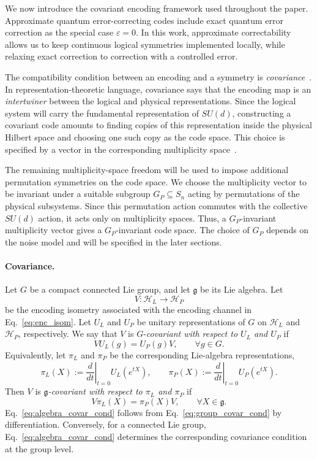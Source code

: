 \documentclass[10pt,twocolumn,superscriptaddress,aps,amsmath,amssymb,citeautoscript,floatfix,prx,longbibliography]{revtex4-2}
\newcounter{alg}
\theoremstyle{plain}
\theoremstyle{plain}
\theoremstyle{plain}
\theoremstyle{plain}
\theoremstyle{plain}
\theoremstyle{plain}
\begin{document}
We now introduce the covariant encoding framework used throughout the paper. Approximate quantum error-correcting codes include exact quantum error correction as the special case $\varepsilon=0$. In this work, approximate correctability allows us to keep continuous logical symmetries implemented locally, while relaxing exact correction to correction with a controlled error.

The compatibility condition between an encoding and a symmetry is \textit{covariance}~\cite{Hayden2021}. In representation-theoretic language, covariance says that the encoding map is an \textit{intertwiner} between the logical and physical representations. Since the logical system will carry the fundamental representation of $SU(d)$, constructing a covariant code amounts to finding copies of this representation inside the physical Hilbert space and choosing one such copy as the code space. This choice is specified by a vector in the corresponding multiplicity space~\cite{Denys2024}.

The remaining multiplicity-space freedom will be used to impose additional permutation symmetries on the code space. We choose the multiplicity vector to be invariant under a suitable subgroup $G_P\subseteq S_n$ acting by permutations of the physical subsystems. Since this permutation action commutes with the collective $SU(d)$ action, it acts only on multiplicity spaces. Thus, a $G_P$-invariant multiplicity vector gives a $G_P$-invariant code space. The choice of $G_P$ depends on the noise model and will be specified in the later sections.


\paragraph{Covariance.} 
Let $G$ be a compact connected Lie group, and let $\mathfrak g$ be its Lie algebra. Let
$$
V:\mathcal H_L\to\mathcal H_P
$$
be the encoding isometry associated with the encoding channel in Eq.~\eqref{eq:enc_isom}. Let $U_L$ and $U_P$ be unitary representations of $G$ on $\mathcal H_L$ and $\mathcal H_P$, respectively. We say that $V$ is $G$-\textit{covariant with respect to $U_L$ and $U_P$} if
\begin{equation}\label{eq:group_covar_cond}
VU_L(g)
=
U_P(g)V,
\qquad
\forall g\in G .
\end{equation}
Equivalently, let $\pi_L$ and $\pi_P$ be the corresponding Lie-algebra representations,
$$
\pi_L(X)
:=
\left.\frac{d}{dt}\right|_{t=0}
U_L(e^{tX}),
\qquad
\pi_P(X)
:=
\left.\frac{d}{dt}\right|_{t=0}
U_P(e^{tX}).
$$
Then $V$ is \textit{$\mathfrak g$-covariant with respect to $\pi_L$ and $\pi_P$} if
\begin{equation}\label{eq:algebra_covar_cond}
V\pi_L(X)
=
\pi_P(X)V,
\qquad
\forall X\in\mathfrak g .
\end{equation}
Eq.~\eqref{eq:algebra_covar_cond} follows from Eq.~\eqref{eq:group_covar_cond} by differentiation. Conversely, for a connected Lie group, Eq.~\eqref{eq:algebra_covar_cond} determines the corresponding covariance condition at the group level.
\end{document}
